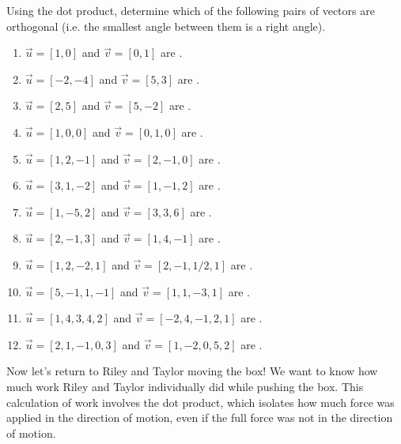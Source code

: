 \documentclass{ximera}
\begin{document}
\begin{problem}
    Using the dot product, determine which of the following pairs of vectors are orthogonal (i.e. the smallest angle between them is a right angle).
    \begin{enumerate}
        \item $\vec{u}=[1,0]$ and $\vec{v}=[0,1]$ are .
        \item $\vec{u}=[-2,-4]$ and $\vec{v}=[5,3]$ are .
        \item $\vec{u}=[2,5]$ and $\vec{v}=[5,-2]$ are .
        \item $\vec{u}=[1,0,0]$ and $\vec{v}=[0,1,0]$ are .
        \item $\vec{u}=[1,2,-1]$ and $\vec{v}=[2,-1,0]$ are .
        \item $\vec{u}=[3,1,-2]$ and $\vec{v}=[1,-1,2]$ are .
        \item $\vec{u}=[1,-5,2]$ and $\vec{v}=[3,3,6]$ are .
        \item $\vec{u}=[2,-1,3]$ and $\vec{v}=[1,4,-1]$ are .
        \item $\vec{u}=[1,2,-2,1]$ and $\vec{v}=[2,-1,1/2,1]$ are .
        \item $\vec{u}=[5,-1,1,-1]$ and $\vec{v}=[1,1,-3,1]$ are .
        \item $\vec{u}=[1,4,3,4,2]$ and $\vec{v}=[-2,4,-1,2,1]$ are .
        \item $\vec{u}=[2,1,-1,0,3]$ and $\vec{v}=[1,-2,0,5,2]$ are .
    \end{enumerate}
\end{problem}

Now let's return to Riley and Taylor moving the box! We want to know how much work Riley and Taylor individually did while pushing the box. This calculation of work involves the dot product, which isolates how much force was applied in the direction of motion, even if the full force was not in the direction of motion.
\end{document}
